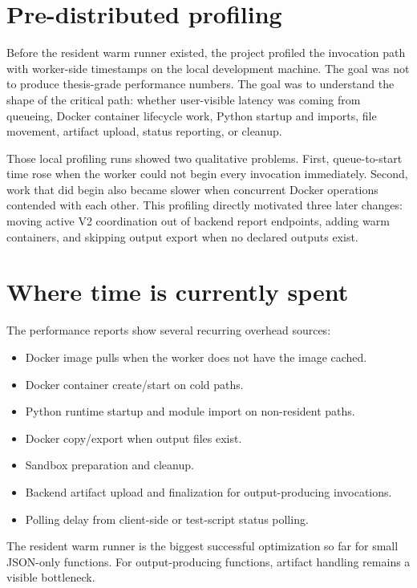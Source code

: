 \documentclass[12pt,a4paper]{report}
\begin{document}
\section{Pre-distributed profiling}

Before the resident warm runner existed, the project profiled the invocation
path with worker-side timestamps on the local development machine. The goal was
not to produce thesis-grade performance numbers. The goal was to understand the
shape of the critical path: whether user-visible latency was coming from
queueing, Docker container lifecycle work, Python startup and imports, file
movement, artifact upload, status reporting, or cleanup.

Those local profiling runs showed two qualitative problems. First, queue-to-start
time rose when the worker could not begin every invocation immediately. Second,
work that did begin also became slower when concurrent Docker operations
contended with each other. This profiling directly motivated three later
changes: moving active V2 coordination out of backend report endpoints, adding
warm containers, and skipping output export when no declared outputs exist.

\section{Where time is currently spent}

The performance reports show several recurring overhead sources:

\begin{itemize}[leftmargin=1.2cm]
  \item Docker image pulls when the worker does not have the image cached.
  \item Docker container create/start on cold paths.
  \item Python runtime startup and module import on non-resident paths.
  \item Docker copy/export when output files exist.
  \item Sandbox preparation and cleanup.
  \item Backend artifact upload and finalization for output-producing invocations.
  \item Polling delay from client-side or test-script status polling.
\end{itemize}

The resident warm runner is the biggest successful optimization so far for
small JSON-only functions. For output-producing functions, artifact handling
remains a visible bottleneck.
\end{document}

